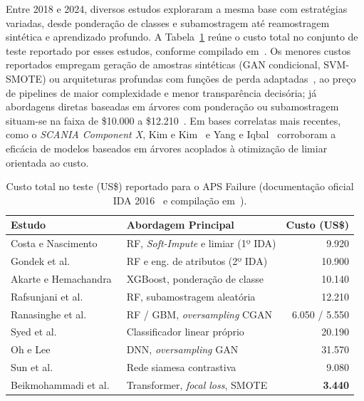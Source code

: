 \documentclass[conference]{IEEEtran}
\begin{document}
Entre 2018 e 2024, diversos estudos exploraram a mesma base com estratégias variadas, desde ponderação de classes e subamostragem até reamostragem sintética e aprendizado profundo. A Tabela~\ref{tab:relacionados} reúne o custo total no conjunto de teste reportado por esses estudos, conforme compilado em~\cite{costtransformer2024}. Os menores custos reportados empregam geração de amostras sintéticas (GAN condicional, SVM-SMOTE) ou arquiteturas profundas com funções de perda adaptadas~\cite{costtransformer2024}, ao preço de pipelines de maior complexidade e menor transparência decisória; já abordagens diretas baseadas em árvores com ponderação ou subamostragem situam-se na faixa de \$10.000 a \$12.210~\cite{akarte2018,rafsunjani2019}. Em bases correlatas mais recentes, como o \textit{SCANIA Component X}, Kim e Kim~\cite{twostage2025} e Yang e Iqbal~\cite{costopt2025} corroboram a eficácia de modelos baseados em árvores acoplados à otimização de limiar orientada ao custo.

\begin{table}[!t]
\caption{Custo total no teste (US\$) reportado para o APS Failure (documentação oficial IDA 2016~\cite{scania_dataset} e compilação em~\cite{costtransformer2024}).}
\label{tab:relacionados}
\centering
\footnotesize
\setlength{\tabcolsep}{3.5pt}
\begin{tabular}{llr}
\toprule
\textbf{Estudo} & \textbf{Abordagem Principal} & \textbf{Custo (US\$)} \\
\midrule
Costa e Nascimento~\cite{costa2016ida} & RF, \textit{Soft-Impute} e limiar (1º IDA) & 9.920 \\
Gondek et al.~\cite{gondek2016prediction} & RF e eng. de atributos (2º IDA) & 10.900 \\
Akarte e Hemachandra~\cite{akarte2018} & XGBoost, ponderação de classe & 10.140 \\
Rafsunjani et al.~\cite{rafsunjani2019} & RF, subamostragem aleatória & 12.210 \\
Ranasinghe et al.~\cite{ranasinghe2019} & RF / GBM, \textit{oversampling} CGAN & 6.050 / 5.550 \\
Syed et al.~\cite{syed2020} & Classificador linear próprio & 20.190 \\
Oh e Lee~\cite{oh2020} & DNN, \textit{oversampling} GAN & 31.570 \\
Sun et al.~\cite{sun2023} & Rede siamesa contrastiva & 9.080 \\
Beikmohammadi et al.~\cite{costtransformer2024} & Transformer, \textit{focal loss}, SMOTE & \textbf{3.440} \\
\bottomrule
\end{tabular}
\end{table}
\end{document}
